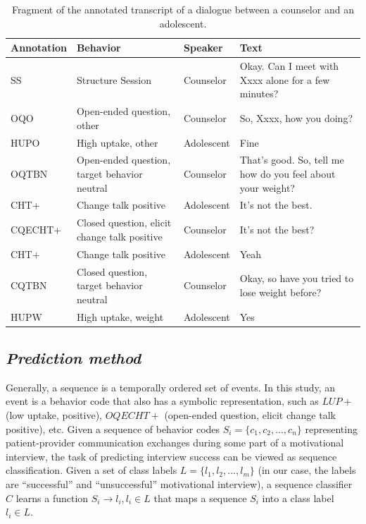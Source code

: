 \documentclass{amia_summit_2018}
\begin{document}
\begin{table}[h]
\caption{Fragment of the annotated transcript of a dialogue between a counselor and an adolescent.}    
\label{tab:anno_examp}
\centering
\begin{tabular}{|l|p{3.2cm}|l|p{8cm}|}
\hline
\bf{Annotation}  & \bf{Behavior} & \bf{Speaker} & \bf{Text} \\\hline
SS & Structure Session & Counselor & Okay. Can I meet with Xxxx alone for a few minutes? \\\hline
OQO & Open-ended question, other & Counselor & So, Xxxx, how you doing? \\\hline
HUPO &	High uptake, other	& Adolescent &	Fine \\\hline
OQTBN &	Open-ended question, target behavior neutral & Counselor &	That's good.  So, tell me  how do you feel about your weight? \\\hline
CHT+ &	Change talk positive	& Adolescent &	It's not the best. \\\hline
CQECHT+ & Closed question, elicit change talk positive & Counselor & It's not the best? \\\hline
CHT+ &	Change talk positive &	Adolescent & Yeah \\\hline
CQTBN &	Closed question, target behavior neutral  & Counselor &	Okay, so have you tried to lose weight before? \\\hline
HUPW &	High uptake, weight & Adolescent &	Yes \\\hline
\end{tabular}
\end{table}  

\subsection*{\textit{Prediction method}}
Generally, a sequence is a temporally ordered set of events. In this study, an event is a behavior code that also has a symbolic representation, such as $LUP+$ (low uptake, positive), $OQECHT+$ (open-ended question, elicit change talk positive), etc.  Given a sequence of behavior codes $S_i = \{c_1, c_2,...,c_n\}$ representing patient-provider communication exchanges during some part of a motivational interview, the task of predicting interview success can be viewed as sequence classification. Given a set of class labels $L = \{l_1, l_2,...,l_m\}$ (in our case, the labels are ``successful'' and ``unsuccessful'' motivational interview), a sequence classifier $C$ learns a function $S_i \to l_i, l_i \in L$ that maps a sequence $S_i$ into a class label $l_i \in L$.
\end{document}
